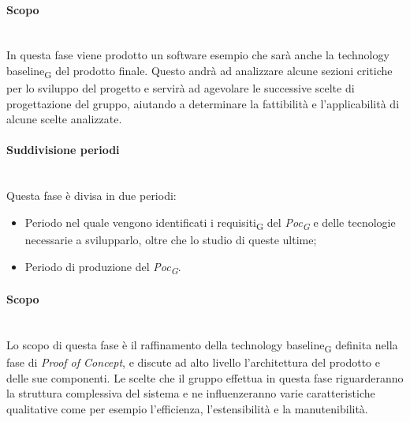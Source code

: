 	\paragraph {Scopo}\mbox{}\\
	In questa fase viene prodotto un software esempio che sarà anche la technology baseline\textsubscript{G} del prodotto finale. Questo andrà ad analizzare alcune sezioni critiche per lo sviluppo del progetto e servirà ad agevolare le successive scelte di progettazione del gruppo, aiutando a determinare la fattibilità e l'applicabilità di alcune scelte analizzate.
	\paragraph {Suddivisione periodi}\mbox{}\\
	Questa fase è divisa in due periodi:
	\begin{itemize}
		\item Periodo nel quale vengono identificati i requisiti\textsubscript{G} del \textit{Poc\textsubscript{G}} e delle 	tecnologie necessarie a svilupparlo, oltre che lo studio di queste ultime;
		\item Periodo di produzione del \textit{Poc\textsubscript{G}}.
	\end{itemize}
	\paragraph {Scopo}\mbox{}\\
	Lo scopo di questa fase è il raffinamento della technology baseline\textsubscript{G} definita nella fase di \textit{Proof of Concept}, e discute ad alto livello l'architettura del prodotto e delle sue componenti. Le scelte che il gruppo effettua in questa fase riguarderanno la struttura complessiva del sistema e ne influenzeranno varie caratteristiche qualitative come per esempio l'efficienza, l'estensibilità e la manutenibilità.
